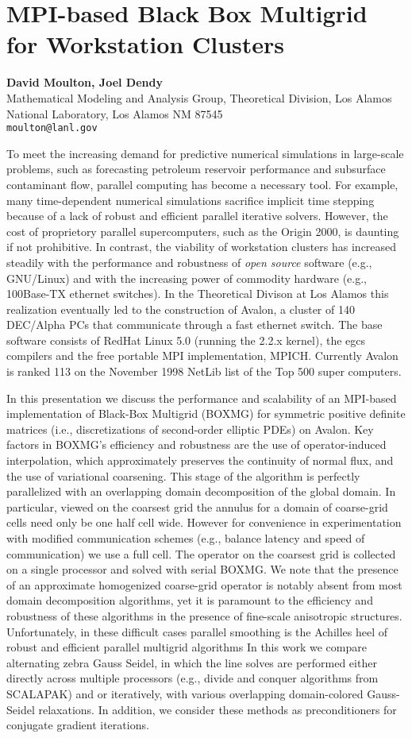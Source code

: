 \documentclass[11pt]{article}
\newcommand{\nextab}[4]{
	\section{#2}
	{\bf #1} \\ \nopagebreak
	{#3} \\ \nopagebreak
	{\tt #4} \nopagebreak
	}
\begin{document}

\nextab{David Moulton, Joel Dendy}
	{MPI-based Black Box Multigrid for Workstation Clusters}
	{Mathematical Modeling and Analysis Group,
	Theoretical Division, Los Alamos National Laboratory,
	Los Alamos NM 87545}
	{moulton@lanl.gov}

To meet the increasing demand for predictive numerical simulations
in large-scale problems, such as forecasting petroleum reservoir
performance and subsurface contaminant flow, parallel computing has
become a necessary tool.  For example, many time-dependent numerical
simulations sacrifice implicit time stepping because of a lack of robust
and efficient parallel iterative solvers.  However, the cost of
proprietory parallel supercomputers, such as the Origin 2000, is
daunting if not prohibitive.  In contrast, the viability of
workstation clusters has increased steadily with the performance and
robustness of {\em open source} software (e.g., GNU/Linux) and with
the increasing power of commodity hardware (e.g., 100Base-TX ethernet
switches).  In the Theoretical Divison at Los Alamos this realization
eventually led to the construction of
Avalon, a cluster of 140
DEC/Alpha PCs that communicate through a fast ethernet switch.  The
base software consists of RedHat Linux 5.0 (running the 2.2.x kernel),
the egcs compilers and the free portable MPI implementation, MPICH.
Currently Avalon is ranked 113 on the November 1998 NetLib list of the
Top 500 super computers.

In this presentation we discuss the performance and scalability of
an MPI-based implementation of Black-Box Multigrid (BOXMG) for symmetric
positive definite matrices (i.e., discretizations of second-order
elliptic PDEs) on Avalon.  Key factors in BOXMG's efficiency
and robustness are the use of operator-induced interpolation,
which approximately preserves the continuity of normal flux,
and the use of variational coarsening.   This stage of the algorithm is
perfectly parallelized with an overlapping domain decomposition
of the global domain.  In particular, viewed on the coarsest grid
the annulus for a domain of coarse-grid cells need only be one half
cell wide. However for convenience in experimentation with modified
communication schemes (e.g., balance latency and speed of
communication) we use a full cell. The operator on the coarsest grid
is collected on a single processor and solved with serial BOXMG.
We note that the presence of an approximate homogenized coarse-grid
operator is notably absent from most domain decomposition algorithms,
yet it is paramount to the efficiency and robustness of these
algorithms in the presence of fine-scale anisotropic structures.
Unfortunately, in these difficult cases parallel smoothing is the
Achilles heel of robust and efficient parallel multigrid algorithms
In this work we compare alternating zebra Gauss Seidel, in which
the line solves are performed either directly across multiple processors
(e.g., divide and conquer algorithms from SCALAPAK)
and or iteratively,  with various overlapping domain-colored Gauss-Seidel
relaxations.  In addition, we consider these methods as
preconditioners for conjugate gradient iterations.
\end{document}
